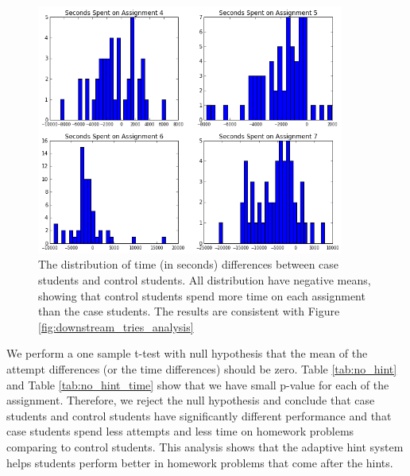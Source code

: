 \documentclass{llncs2e/llncs}
\begin{document}
\begin{figure}[ht]
\centering
\includegraphics[width=0.9\textwidth]{image/assignment_time_downstream.png}
\caption{The distribution of time (in seconds) differences between case students and control students. All distribution have negative means, showing that control students spend more time on each assignment than the case students. The results are consistent with Figure \ref{fig:downstream_tries_analysis}}
    \label{fig:downstream_time_analysis}
\end{figure}

We perform a one sample t-test with null hypothesis that the mean of
the attempt differences (or the time differences) should be
zero. Table \ref{tab:no_hint} and Table \ref{tab:no_hint_time} show
that we have small p-value for each of the assignment. Therefore, we
reject the null hypothesis and conclude that case students and control
students have significantly different performance and that case
students spend less attempts and less time on homework problems
comparing to control students. This analysis shows that the adaptive
hint system helps students perform better in homework problems that
come after the hints.
\end{document}

